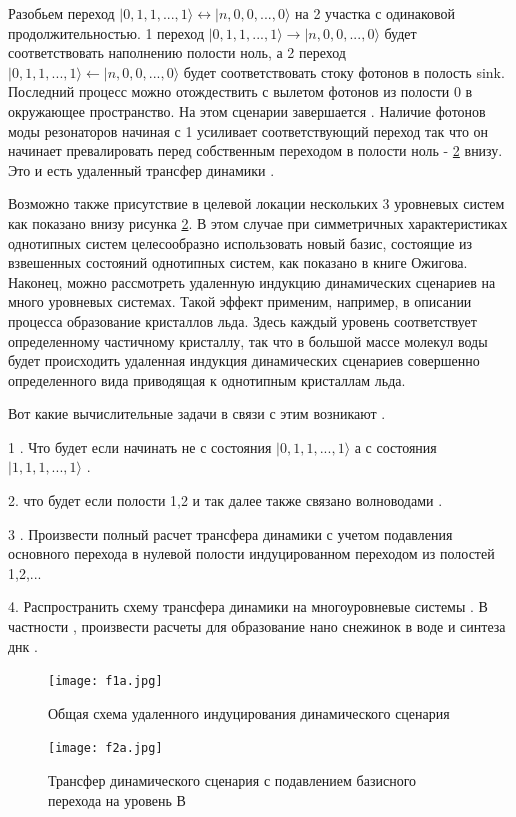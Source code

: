 \documentclass[12pt]{article}
\begin{document}
Разобьем переход $|0,1,1,...,1\rangle\leftrightarrow |n,0,0,...,0\rangle$ на 2 участка с одинаковой продолжительностью. 1 переход $|0,1,1,...,1\rangle\rightarrow |n,0,0,...,0\rangle$ будет соответствовать наполнению полости ноль, а 2 переход $|0,1,1,...,1\rangle\leftarrow |n,0,0,...,0\rangle$ будет соответствовать стоку фотонов в полость sink. Последний процесс можно отождествить с вылетом фотонов из полости 0 в окружающее пространство. На этом сценарии завершается . Наличие фотонов моды резонаторов начиная с 1 усиливает соответствующий переход так что он начинает превалировать перед собственным переходом в полости ноль - \ref{fig:f2a} внизу. Это и есть удаленный трансфер динамики . 

Возможно также присутствие в целевой локации нескольких 3 уровневых систем как показано внизу рисунка \ref{fig:f2a}. В этом случае при симметричных характеристиках однотипных систем целесообразно использовать новый базис, состоящие из взвешенных состояний однотипных систем, как показано в книге Ожигова. Наконец, можно рассмотреть удаленную индукцию динамических сценариев на много уровневых системах. Такой эффект применим, например, в описании процесса образование кристаллов льда. Здесь каждый уровень соответствует определенному частичному кристаллу, так что в большой массе молекул воды будет происходить удаленная индукция динамических сценариев совершенно определенного вида приводящая к однотипным кристаллам льда. 

Вот какие вычислительные задачи в связи с этим возникают . 

1 . Что будет если начинать не с состояния $|0,1,1,...,1\rangle$ а с состояния $|1,1,1,...,1\rangle$ . 

2. что будет если полости 1,2 и так далее также связано волноводами . 

3 . Произвести полный расчет трансфера динамики с учетом подавления основного перехода в нулевой полости индуцированном переходом из полостей 1,2,...

4. Распространить схему трансфера динамики на многоуровневые системы . В частности , произвести расчеты для образование нано снежинок в воде и синтеза днк .




\begin{figure}[H]
\centering
\texttt{[image: f1a.jpg]} 
\caption{ Общая схема удаленного индуцирования динамического сценария }
\label{fig:f1a}
\end{figure}

\begin{figure}[H]
\centering
\texttt{[image: f2a.jpg]} 
\caption{ Трансфер динамического сценария с подавлением базисного перехода на уровень В}
\label{fig:f2a}
\end{figure}
\end{document}
